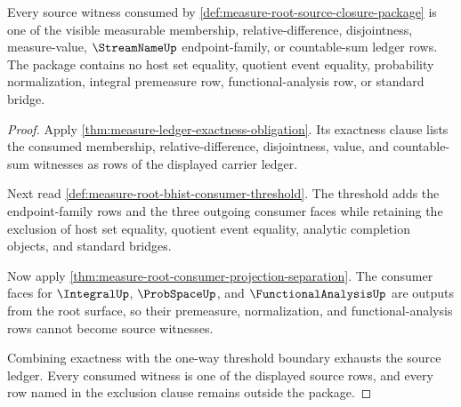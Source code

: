 \begin{theorem}
\label{thm:measure-root-source-ledger-exhaustion}
Every source witness consumed by
\autoref{def:measure-root-source-closure-package} is one of the visible
measurable membership, relative-difference, disjointness, measure-value,
$\StreamNameUp$ endpoint-family, or countable-sum ledger rows. The package
contains no host set equality, quotient event equality, probability
normalization, integral premeasure row, functional-analysis row, or standard
bridge.
\end{theorem}
\begin{proof}
Apply \autoref{thm:measure-ledger-exactness-obligation}. Its exactness clause
lists the consumed membership, relative-difference, disjointness, value, and
countable-sum witnesses as rows of the displayed carrier ledger.

Next read \autoref{def:measure-root-bhist-consumer-threshold}. The threshold
adds the endpoint-family rows and the three outgoing consumer faces while
retaining the exclusion of host set equality, quotient event equality,
analytic completion objects, and standard bridges.

Now apply \autoref{thm:measure-root-consumer-projection-separation}. The
consumer faces for $\IntegralUp$, $\ProbSpaceUp$, and
$\FunctionalAnalysisUp$ are outputs from the root surface, so their
premeasure, normalization, and functional-analysis rows cannot become source
witnesses.

Combining exactness with the one-way threshold boundary exhausts the source
ledger. Every consumed witness is one of the displayed source rows, and every
row named in the exclusion clause remains outside the package.
\end{proof}

